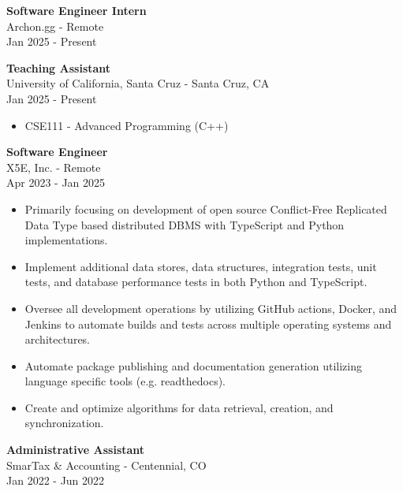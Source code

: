 \documentclass[a4paper,10pt]{article}
\begin{document}
\begin{flushleft}
\textbf{Software Engineer Intern} \\
Archon.gg - Remote \\
Jan 2025 - Present
\end{flushleft}

\begin{flushleft}
\textbf{Teaching Assistant} \\
University of California, Santa Cruz - Santa Cruz, CA \\
Jan 2025 - Present
\begin{itemize}
    \item CSE111 - Advanced Programming (C++)
\end{itemize}
\end{flushleft}

\begin{flushleft}
\textbf{Software Engineer} \\
X5E, Inc. - Remote \\
Apr 2023 - Jan 2025
\begin{itemize}
    \item Primarily focusing on development of open source Conflict-Free Replicated Data Type based distributed DBMS with TypeScript and Python implementations.
    \item Implement additional data stores, data structures, integration tests, unit tests, and database performance tests in both Python and TypeScript.
    \item Oversee all development operations by utilizing GitHub actions, Docker, and Jenkins to automate builds and tests across multiple operating systems and architectures.
    \item Automate package publishing and documentation generation utilizing language specific tools (e.g. readthedocs).
    \item Create and optimize algorithms for data retrieval, creation, and synchronization.
\end{itemize}
\end{flushleft}

\begin{flushleft}
\textbf{Administrative Assistant} \\
SmarTax \& Accounting - Centennial, CO \\
Jan 2022 - Jun 2022
\end{flushleft}
\end{document}
